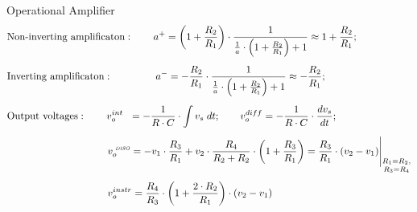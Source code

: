 \documentclass[11pt]{article}
\begin{document}
\begin{sectionbox}{Operational Amplifier}
\begin{align*}
& \text{Non-inverting amplificaton}: \qquad
  a^{+} = \left(1 + \frac{R_2}{R_1}\right) \cdot \frac{1}{\frac{1}{a} \cdot \left( 1 + \frac{R_2}{R_1} \right) + 1} \approx 
    1 + \frac{R_2}{R_1};\\[0.5em]
& \text{Inverting amplificaton}: \qquad \qquad \;
  a^{-} = - \frac{R_2}{R_1} \cdot \frac{1}{\frac{1}{a} \cdot \left( 1 + \frac{R_2}{R_1} \right) + 1} \approx 
    - \frac{R_2}{R_1};\\[0.5em]
& \text{Output voltages}: \qquad
  v_{o}^{int} \; \, \, = - \frac{1}{R \cdot C} \cdot \int v_s \; dt; \qquad
  v_{o}^{diff} = - \frac{1}{R \cdot C} \cdot \frac{d v_s}{d t} ; \\[0.5em]
& \hspace*{10em} v_{o}^{\text{\smaller[2] \emph{DISO}}} = - v_1 \cdot \frac{R_3}{R_1} + v_2 \cdot \frac{R_4}{R_2 + R_2} \cdot \left( 1 + \frac{R_3}{R_1} \right) =
  \frac{R_3}{R_1} \cdot (v_2 - v_1) \Bigg|_{\substack{R_1 = R_2, \\[0.1em] R_3 = R_4}} \\[0.5em]
& \hspace*{10em} v_{o}^{instr} = \frac{R_4}{R_3} \cdot \left( 1 + \frac{2 \cdot R_2}{R_1} \right) \cdot (v_2 - v_1)
\end{align*}
\end{sectionbox}
\end{document}
